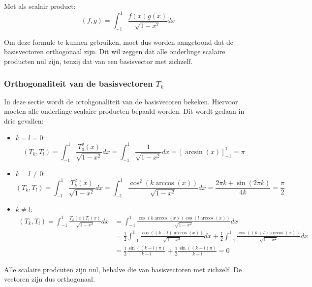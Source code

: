 \documentclass[a4paper, 12pt, titlepage, fleqn]{article}
\begin{document}
Met als scalair product:
\begin{equation*}
(f,g) = \int_{-1}^1\frac{f(x)g(x)}{\sqrt{1-x^2}}dx
\end{equation*}

Om deze formule te kunnen gebruiken, moet dus worden aangetoond dat de basisvectoren orthogonaal zijn. Dit wil zeggen dat alle onderlinge scalaire producten nul zijn, tenzij dat van een basisvector met zichzelf. 

\subsubsection{Orthogonaliteit van de basisvectoren $T_k$}
\label{subsec:scalaireProducten}
In deze sectie wordt de ortohgonaliteit van de basisvecoren bekeken. Hiervoor moeten alle onderlinge scalaire producten bepaald worden. Dit wordt gedaan in drie gevallen:
\begin{itemize}
\item $k = l = 0$:
\begin{equation*}
(T_k,T_l) = \int_{-1}^1 \frac{T_0^2(x)}{\sqrt{1-x^2}}dx = \int_{-1}^1 \frac{1}{\sqrt{1-x^2}}dx =\left[\arcsin(x)\right]_{-1}^1 = \pi
\end{equation*}
\item $k = l \neq 0$:
\begin{equation*}
(T_k,T_l) = \int_{-1}^1\frac{T_k^2(x)}{\sqrt{1-x^2}}dx = \int_{-1}^1\frac{\cos^2(k \arccos(x))}{\sqrt{1-x^2}}dx = \frac{2\pi k + \sin(2\pi k)}{4k} = \frac{\pi}{2}
\end{equation*}
\item $k \neq l$:
\begin{align*}
(T_k,T_l) = \int_{-1}^1\frac{T_k(x)T_l(x)}{\sqrt{1-x^2}}dx &= \int_{-1}^1\frac{\cos(k \arccos(x))\cos(l \arccos(x))}{\sqrt{1-x^2}}dx\\
&=\frac{1}{2}\int_{-1}^1\frac{\cos((k-l)\arccos(x))}{\sqrt{1-x^2}}dx + \frac{1}{2}\int_{-1}^1\frac{\cos((k+l)\arccos(x))}{\sqrt{1-x^2}}dx\\
&=\frac{1}{2}\frac{\sin((k-l)\pi)}{k-l} + \frac{1}{2}\frac{\sin((k+l)\pi)}{k+l} = 0
\end{align*}
\end{itemize}
Alle scalaire prodcuten zijn nul, behalve die van basisvectoren met zichzelf. De vectoren zijn dus orthogonaal.
\end{document}

